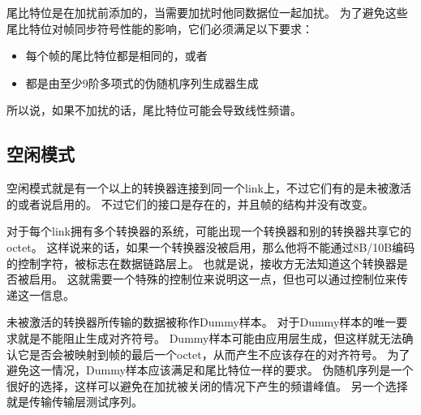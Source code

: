 \documentclass[UTF8]{ctexart}
\begin{document}
尾比特位是在加扰前添加的，当需要加扰时他同数据位一起加扰。
为了避免这些尾比特位对帧同步符号性能的影响，它们必须满足以下要求：

\begin{itemize}
	\item 每个帧的尾比特位都是相同的，或者
	\item 都是由至少9阶多项式的伪随机序列生成器生成
\end{itemize}

所以说，如果不加扰的话，尾比特位可能会导致线性频谱。

\subsection{空闲模式}

空闲模式就是有一个以上的转换器连接到同一个link上，不过它们有的是未被激活的或者说启用的。
不过它们的接口是存在的，并且帧的结构并没有改变。

对于每个link拥有多个转换器的系统，可能出现一个转换器和别的转换器共享它的octet。
这样说来的话，如果一个转换器没被启用，那么他将不能通过8B/10B编码的控制字符，被标志在数据链路层上。
也就是说，接收方无法知道这个转换器是否被启用。
这就需要一个特殊的控制位来说明这一点，但也可以通过控制位来传递这一信息。

未被激活的转换器所传输的数据被称作Dummy样本。
对于Dummy样本的唯一要求就是不能阻止生成对齐符号。
Dummy样本可能由应用层生成，但这样就无法确认它是否会被映射到帧的最后一个octet，从而产生不应该存在的对齐符号。
为了避免这一情况，Dummy样本应该满足和尾比特位一样的要求。
伪随机序列是一个很好的选择，这样可以避免在加扰被关闭的情况下产生的频谱峰值。
另一个选择就是传输传输层测试序列。


\end{document}
